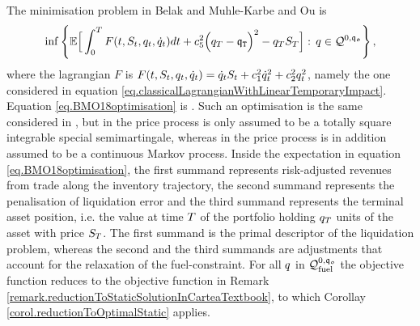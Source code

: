 \documentclass[10pt,a4paper]{article}
\begin{document}
The minimisation problem in  Belak and Muhle-Karbe and Ou \cite{BMO18opt} is 
\begin{equation}
\label{eq.BMO18optimisation}
\inf\left\lbrace
\mathbb{{E}}\Big[
\int_{0}^{T}F(t,S_t,q_t,\dot{q}_{t}) dt 
+ c_{5}^{2} \Big(q_T - \mathfrak{q}_{\mathtt{T} }\Big)^{2} 
- q_{T} S_T 
\Big] : \, 
q \in \mathcal{Q}^{0,\mathfrak{q_0}}
\right\rbrace,
\end{equation}
where the lagrangian $F$ is $F(t,S_t,q_t,\dot{q}_{t})  = \dot{q}_{t} S_t + c_{1}^{2} \dot{q}_{t}^{2} + c_{2}^{2} q_{t}^{2}$, namely the one considered in equation \eqref{eq.classicalLagrangianWithLinearTemporaryImpact}. Equation \eqref{eq.BMO18optimisation} is \cite[Equation (2.1)]{BMO18opt}. Such an optimisation is the same considered in \cite[Equation (3.3)]{LN19inc}, but in \cite[Equation (2.1)]{BMO18opt} the price process is only assumed to be a totally square integrable special semimartingale, whereas in \cite[Equation (3.3)]{LN19inc} the price process is in addition assumed to be a continuous  Markov process. Inside the expectation in equation \eqref{eq.BMO18optimisation}, the first summand represents risk-adjusted revenues from trade along the inventory trajectory, the second summand represents the penalisation of liquidation error and the third summand represents the terminal asset position, i.e. the value at time $T$ of the portfolio holding $q_T$ units of the asset with price $S_T$. The first summand is the primal descriptor of the liquidation problem, whereas the second and the third summands are adjustments that account for the relaxation of the fuel-constraint. For all $q$ in $\mathcal{Q}_{\text{fuel}}^{0,\mathfrak{q_0}}$ the objective function reduces to the objective function in Remark \ref{remark.reductionToStaticSolutionInCarteaTextbook}, to which Corollay \ref{corol.reductionToOptimalStatic} applies. 
\end{document}
